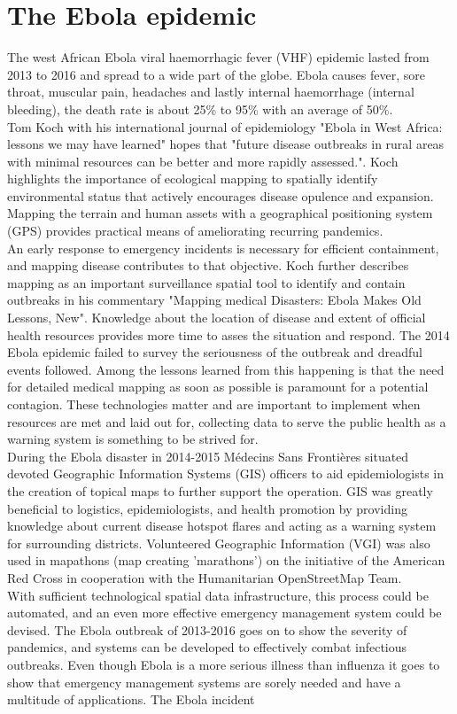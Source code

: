 \section{The Ebola epidemic}
The west African Ebola viral haemorrhagic fever (VHF) epidemic lasted from 2013 to 2016 and spread to a wide part of the globe. Ebola causes fever, sore throat, muscular pain, headaches and lastly internal haemorrhage (internal bleeding), the death rate is about 25\% to 95\% with an average of 50\%\cite{who_ebola}. \\Tom Koch\cite{koch2016ebola} with his international journal of epidemiology "Ebola in West Africa: lessons we may have learned" hopes that "future disease outbreaks in rural areas with minimal resources can be better and more rapidly assessed.". Koch highlights the importance of ecological mapping to spatially identify environmental status that actively encourages disease opulence and expansion. Mapping the terrain and human assets with a geographical positioning system (GPS) provides practical means of ameliorating recurring pandemics. \\An early response to emergency incidents is necessary for efficient containment, and mapping disease contributes to that objective. Koch further describes mapping as an important surveillance spatial tool to identify and contain outbreaks in his commentary "Mapping medical Disasters: Ebola Makes Old Lessons, New"\cite{koch2015mapping}. Knowledge about the location of disease and extent of official health resources provides more time to asses the situation and respond. The 2014 Ebola epidemic failed to survey the seriousness of the outbreak and dreadful events followed. Among the lessons learned from this happening is that the need for detailed medical mapping as soon as possible is paramount for a potential contagion. These technologies matter and are important to implement when resources are met and laid out for, collecting data to serve the public health as a warning system is something to be strived for.\\ During the Ebola disaster in 2014-2015 Médecins Sans Frontières\cite{gis_support} situated devoted Geographic Information Systems (GIS) officers to aid epidemiologists in the creation of topical maps to further support the operation. GIS was greatly beneficial to logistics, epidemiologists, and health promotion by providing knowledge about current disease hotspot flares and acting as a warning system for surrounding districts. Volunteered Geographic Information (VGI) was also used\cite{moeller2015mapping} in mapathons (map creating 'marathons') on the initiative of the American Red Cross in cooperation with the Humanitarian OpenStreetMap Team.\\ With sufficient technological spatial data infrastructure, this process could be automated, and an even more effective emergency management system could be devised. The Ebola outbreak of 2013-2016 goes on to show the severity of pandemics, and systems can be developed to effectively combat infectious outbreaks. Even though Ebola is a more serious illness than influenza it goes to show that emergency management systems are sorely needed and have a multitude of applications. The Ebola incident 